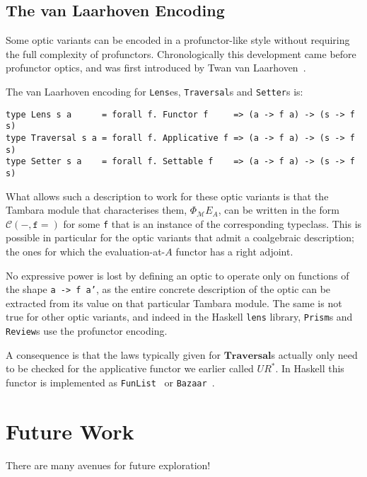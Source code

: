 \documentclass[11pt,letterpaper]{article}
\theoremstyle{plain}
\theoremstyle{definition}
\newcommand{\C}{\mathscr{C}}
\newcommand{\M}{\mathscr{M}}
\newcommand{\lenslib}{\texttt{lens}}
\newcommand{\Pastro}{\Phi}
\newcommand{\Traversal}{\mathbf{Traversal}}
\begin{document}
\subsection{The van Laarhoven Encoding}\label{sec:van-laarhoven}

Some optic variants can be encoded in a profunctor-like style without requiring the full complexity of profunctors. Chronologically this development came before profunctor optics, and was first introduced by Twan van Laarhoven~\cite{VanLaarhovenPost}.

The van Laarhoven encoding for \texttt{Lens}es, \texttt{Traversal}s and \texttt{Setter}s is:
\begin{verbatim}
type Lens s a      = forall f. Functor f     => (a -> f a) -> (s -> f s)
type Traversal s a = forall f. Applicative f => (a -> f a) -> (s -> f s)
type Setter s a    = forall f. Settable f    => (a -> f a) -> (s -> f s)
\end{verbatim}
What allows such a description to work for these optic variants is that the Tambara module that characterises them, $\Pastro_\M E_A$, can be written in the form $\C(-, \texttt{f}=)$ for some \texttt{f} that is an instance of the corresponding typeclass. This is possible in particular for the optic variants that admit a coalgebraic description; the ones for which the evaluation-at-$A$ functor has a right adjoint.

No expressive power is lost by defining an optic to operate only on functions of the shape \texttt{a -> f a'}, as the entire concrete description of the optic can be extracted from its value on that particular Tambara module. The same is not true for other optic variants, and indeed in the Haskell \lenslib{} library, \texttt{Prism}s and \texttt{Review}s use the profunctor encoding.

A consequence is that the laws typically given for $\Traversal$s actually only need to be checked for the applicative functor we earlier called $UR^*$. In Haskell this functor is implemented as \texttt{FunList}~\cite{FunListPost} or \texttt{Bazaar}~\cite{LensLibrary}.

\section{Future Work}

There are many avenues for future exploration!
\end{document}
